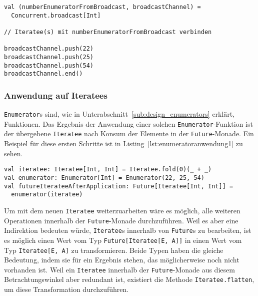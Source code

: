 \begin{lstlisting}[caption=Erstellung eines Enumerators durch die broadcast-Konstruktormethode, label=lst:enumeratorerstellung_durch_broadcast]
val (numberEnumeratorFromBroadcast, broadcastChannel) =
  Concurrent.broadcast[Int]

// Iteratee(s) mit numberEnumeratorFromBroadcast verbinden

broadcastChannel.push(22)
broadcastChannel.push(25)
broadcastChannel.push(54)
broadcastChannel.end()
\end{lstlisting}



\subsubsection{Anwendung auf Iteratees} %
\label{ssub:anwendung_auf_iteratees}

\lstinline|Enumerator|s sind, wie in Unterabschnitt~\ref{sub:design_enumerators} erklärt, Funktionen.
Das Ergebnis der Anwendung einer solchen \lstinline|Enumerator|-Funktion ist der übergebene \lstinline|Iteratee| nach Konsum der Elemente in der \lstinline|Future|-Monade.
Ein Beispiel für diese ersten Schritte ist in Listing~\ref{lst:enumeratoranwendung1} zu sehen.

\begin{lstlisting}[caption=Anwendung eines Enumerators auf einen Iteratee, label=lst:enumeratoranwendung1]
val iteratee: Iteratee[Int, Int] = Iteratee.fold(0)(_ + _)
val enumerator: Enumerator[Int] = Enumerator(22, 25, 54)
val futureIterateeAfterApplication: Future[Iteratee[Int, Int]] =
  enumerator(iteratee)
\end{lstlisting}


Um mit dem neuen \lstinline|Iteratee| weiterzuarbeiten wäre es möglich, alle weiteren Operationen innerhalb der \lstinline|Future|-Monade durchzuführen.
Weil es aber eine Indirektion bedeuten würde, \lstinline|Iteratee|s innerhalb von \lstinline|Future|s zu bearbeiten, ist es möglich einen Wert vom Typ \lstinline|Future[Iteratee[E, A]]| in einen Wert vom Typ \lstinline|Iteratee[E, A]| zu transformieren.
Beide Typen haben die gleiche Bedeutung, indem sie für ein Ergebnis stehen, das möglicherweise noch nicht vorhanden ist.
Weil ein \lstinline|Iteratee| innerhalb der \lstinline|Future|-Monade aus diesem Betrachtungswinkel aber redundant ist, existiert die Methode \lstinline|Iteratee.flatten|, um diese Transformation durchzuführen.


